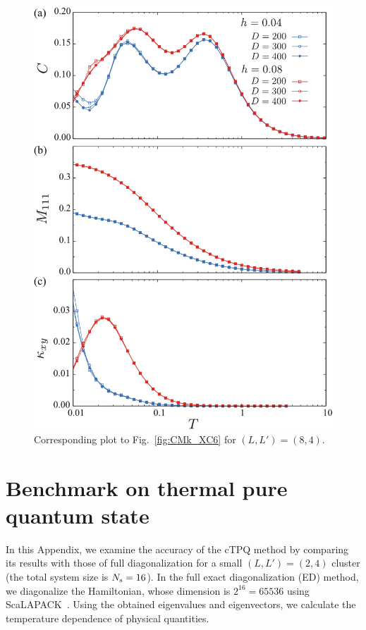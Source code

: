 \documentclass[twocolumn,superscriptaddress,showpacs, longbibliography, aps, prb]{revtex4-2}
\newcommand{\red}[1]{\textcolor{red}{#1}}
\newcommand{\orange}[1]{\textcolor{orange}{#1}}
\begin{document}
\begin{figure}
  \begin{center}
    \includegraphics[width=0.9\linewidth]{Figs/plot_CMk_XC4.pdf}
  \end{center}
  \caption{Corresponding plot to Fig.~\ref{fig:CMk_XC6} for $(L, L') = (8, 4)$.} 
  \label{fig:CMk_XC4}
\end{figure}




\section{Benchmark on thermal pure quantum state}
\label{app:cTPQ}
In this Appendix, we examine the accuracy of the cTPQ method %
by comparing %
its results with those of
full diagonalization for a small $(L, L') = (2, 4)$ cluster (the total system size is $N_{\rm s}=16$).
In the full exact diagonalization (ED) method, we diagonalize the Hamiltonian, whose dimension is
$2^{16}=65536$ using ScaLAPACK~\cite{scalapack}. 
Using the obtained eigenvalues and eigenvectors,
we calculate the temperature dependence of %
physical quantities.
\end{document}
